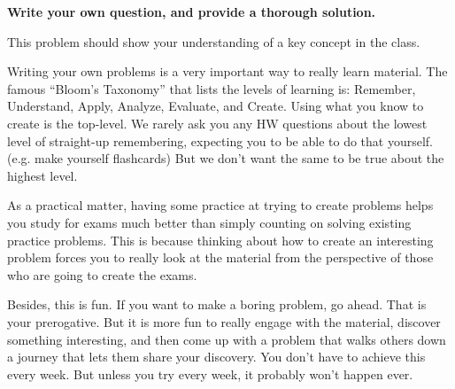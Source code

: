 
{\bf Write your own question, and provide a thorough solution.}

This problem should show your understanding of a key concept in the class.

Writing your own problems is a very important way to really learn
material. The famous ``Bloom's Taxonomy'' that lists the levels of
learning is: Remember, Understand, Apply, Analyze, Evaluate, and
Create. Using what you know to create is the top-level. We rarely ask
you any HW questions about the lowest level of straight-up
remembering, expecting you to be able to do that yourself. (e.g. make
yourself flashcards) But we don't want the same to be true about the
highest level.

As a practical matter, having some practice at trying to create
problems helps you study for exams much better than simply counting on
solving existing practice problems. This is because thinking about how
to create an interesting problem forces you to really look at the
material from the perspective of those who are going to create the
exams. 

Besides, this is fun. If you want to make a boring problem, go
ahead. That is your prerogative. But it is more fun to really engage
with the material, discover something interesting, and then come up
with a problem that walks others down a journey that lets them share
your discovery. You don't have to achieve this every week. But unless
you try every week, it probably won't happen ever. 
